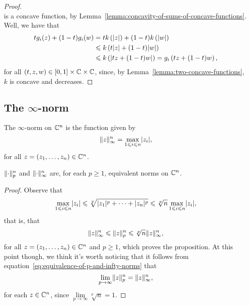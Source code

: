 \begin{proof}
\[  \]
  is a concave function, by
  Lemma~\ref{lemma:concavity-of-sums-of-concave-functions}. Well, we have that
  \begin{align*}
    tg_{i}(z)+(1-t)g_{i}(w)
    &=
    tk\left(\lvert z\rvert\right)+(1-t)k\left(\lvert w\rvert\right)
    \\
    &\leqslant
    k\left(t\lvert z\rvert+(1-t)\lvert w\rvert\right)
    \\
    &\leqslant
    k\left(\lvert tz+(1-t)w\rvert\right)
    =
    g_{i}\left(tz+(1-t)w\right),
  \end{align*}
  for all \((t,z,w)\in{[0,1]\times\mathbb{C}\times\mathbb{C}}\), since,
  by Lemma~\ref{lemma:two-concave-functions}, \(k\) is concave and decreases.
\end{proof}

\subsection{The \(\infty\)-norm}\label{subsec:infty-norm}

\begin{definition}
  The \(\infty\)-norm on \(\mathbb{C}^{n}\) is the function given by
  \[
    \norm<n>[\infty](z)
    =
    \max\limits_{1\leqslant{i}\leqslant{n}}\abs{z_{i}},
  \]
  for all \(z=(z_{1},\ldots,z_{n})\in\mathbb{C}^{n}\).
\end{definition}

\begin{proposition}
  \(\norm<n>[p]\) and \(\norm<n>[\infty]\) are, for each \(p\geqslant{1}\),
  equivalent norms on \(\mathbb{C}^{n}\).
\end{proposition}

\begin{proof}
  Observe that
  \[
    \max\limits_{1\leqslant{i}\leqslant{n}}\lvert z_{i}\rvert
    \leqslant\sqrt[p]{\lvert z_{1}\rvert^{p}+\cdots+\lvert z_{n}\rvert^{p}}
    \leqslant\sqrt[p]{n}\max\limits_{1\leqslant{i}\leqslant{n}}\lvert z_{i}\rvert,
  \]
  that is, that
  \begin{equation}\label{eq:equivalence-of-p-and-infty-norms}
    \norm<n>[\infty](z)
    \leqslant
    \norm<n>[p](z)
    \leqslant
    \sqrt[p]{n}\norm<n>[\infty](z),
  \end{equation}
  for all \(z=(z_{1},\ldots,z_{n})\in\mathbb{C}^{n}\) and \(p\geqslant{1}\),
  which proves the proposition. At this point though, we think it's worth
  noticing that it follows from
  equation~\eqref{eq:equivalence-of-p-and-infty-norms} that
  \[
    \lim\limits_{p\to\infty}\norm<n>[p](z)=\norm<n>[\infty](z),
  \]
  for each \(z\in\mathbb{C}^{n}\), since
  \(\lim\limits_{p\to\infty}\sqrt[p]{n}=1\).
\end{proof}

